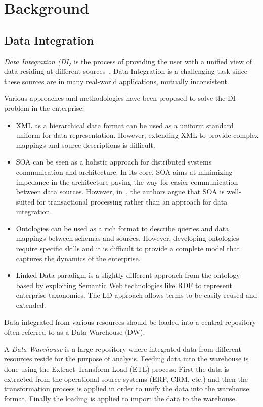 \chapter{Background} \label{chapter:part2-background}
\graphicspath{{Part2/Background/figures/}}

\section{Data Integration}\label{section:dataIntegration}

\textit{Data Integration (DI)} is the process of providing the user with a unified view of data residing at different sources~\cite{Lenzerini:DIT:02}. Data Integration is a challenging task since these sources are in many real-world applications, mutually inconsistent.

Various approaches and methodologies have been proposed to solve the DI problem in the enterprise:
\begin{itemize}
	\item XML as a hierarchical data format can be used as a uniform standard uniform for data representation. However, extending XML to provide complex mappings and source descriptions is difficult.
	\item SOA can be seen as a holistic approach for distributed systems communication and architecture. In its core, SOA aims at minimizing impedance in the architecture paving the way for easier communication between data sources. However, in~\cite{Frischmuth:ISWC:13}, the authors argue that SOA is well-suited for transactional processing rather than an approach for data integration.
	\item Ontologies can be used as a rich format to describe queries and data mappings between schemas and sources. However, developing ontologies require specific skills and it is difficult to provide a complete model that captures the dynamics of the enterprise.
	\item Linked Data paradigm is a slightly different approach from the ontology-based by exploiting Semantic Web technologies like RDF to represent enterprise taxonomies. The LD approach allows terms to be easily reused and extended.
\end{itemize}

Data integrated from various resources should be loaded into a central repository often referred to as a Data Warehouse (DW).

A \textit{Data Warehouse} is a large repository where integrated data from different resources reside for the purpose of analysis. Feeding data into the warehouse is done using the Extract-Transform-Load (ETL) process: First the data is extracted from the operational source systems (ERP, CRM, etc.) and then the transformation process is applied in order to unify the data into the warehouse format. Finally the loading is applied to import the data to the warehouse.

